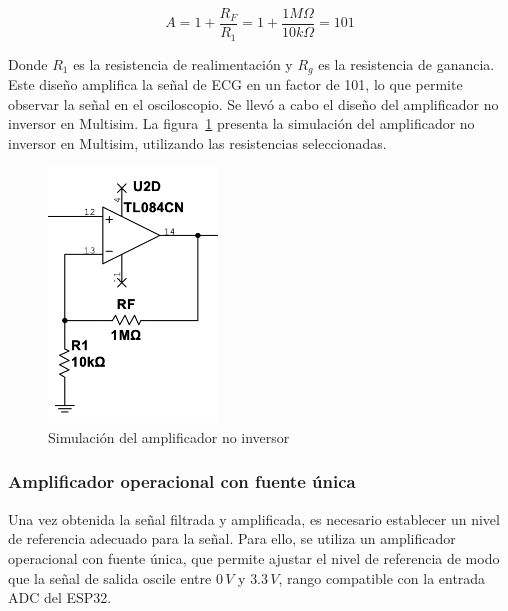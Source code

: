         \begin{equation}
            \label{eq:ganancia_amplificador_no_inversor}
            A = 1 + \frac{R_F}{R_{1}} = 1 + \frac{1 M\Omega}{10 k\Omega} = 101
        \end{equation}

        Donde $R_1$ es la resistencia de realimentación y $R_g$ es la resistencia de ganancia. Este diseño amplifica la señal de ECG en un factor de 101, lo 
        que permite observar la señal en el osciloscopio.
        Se llevó a cabo el diseño del amplificador no inversor en Multisim. La figura~\ref{fig:Simulacion_Amplificador_No_Inversor} presenta la simulación del amplificador no inversor en Multisim, utilizando las resistencias seleccionadas.

        \begin{figure}[H]
            \centering
            \includegraphics[width=0.4\textwidth]{img/Desarrollo/multisim_AmpNoInversor.png}
            \caption[Simulación del amplificador no inversor.]{Simulación del amplificador no inversor\footnotemark}
            \label{fig:Simulacion_Amplificador_No_Inversor}
        \end{figure}

        \subsubsection{Amplificador operacional con fuente única}
        Una vez obtenida la señal filtrada y amplificada, es necesario establecer un nivel de referencia adecuado para la señal. Para ello, se utiliza un amplificador operacional con fuente única, que permite ajustar el nivel de referencia de modo que la señal de salida oscile entre $0\,V$ y $3.3\,V$, rango compatible con la entrada ADC del ESP32.

